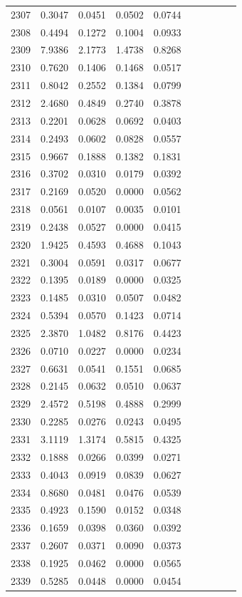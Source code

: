 \begin{table}
\begin{tabular}{cccccccccc}
2307& 0.3047& 0.0451& 0.0502& 0.0744\\ 
2308& 0.4494& 0.1272& 0.1004& 0.0933\\ 
2309& 7.9386& 2.1773& 1.4738& 0.8268\\ 
2310& 0.7620& 0.1406& 0.1468& 0.0517\\ 
2311& 0.8042& 0.2552& 0.1384& 0.0799\\ 
2312& 2.4680& 0.4849& 0.2740& 0.3878\\ 
2313& 0.2201& 0.0628& 0.0692& 0.0403\\ 
2314& 0.2493& 0.0602& 0.0828& 0.0557\\ 
2315& 0.9667& 0.1888& 0.1382& 0.1831\\ 
2316& 0.3702& 0.0310& 0.0179& 0.0392\\ 
2317& 0.2169& 0.0520& 0.0000& 0.0562\\ 
2318& 0.0561& 0.0107& 0.0035& 0.0101\\ 
2319& 0.2438& 0.0527& 0.0000& 0.0415\\ 
2320& 1.9425& 0.4593& 0.4688& 0.1043\\ 
2321& 0.3004& 0.0591& 0.0317& 0.0677\\ 
2322& 0.1395& 0.0189& 0.0000& 0.0325\\ 
2323& 0.1485& 0.0310& 0.0507& 0.0482\\ 
2324& 0.5394& 0.0570& 0.1423& 0.0714\\ 
2325& 2.3870& 1.0482& 0.8176& 0.4423\\ 
2326& 0.0710& 0.0227& 0.0000& 0.0234\\ 
2327& 0.6631& 0.0541& 0.1551& 0.0685\\ 
2328& 0.2145& 0.0632& 0.0510& 0.0637\\ 
2329& 2.4572& 0.5198& 0.4888& 0.2999\\ 
2330& 0.2285& 0.0276& 0.0243& 0.0495\\ 
2331& 3.1119& 1.3174& 0.5815& 0.4325\\ 
2332& 0.1888& 0.0266& 0.0399& 0.0271\\ 
2333& 0.4043& 0.0919& 0.0839& 0.0627\\ 
2334& 0.8680& 0.0481& 0.0476& 0.0539\\ 
2335& 0.4923& 0.1590& 0.0152& 0.0348\\ 
2336& 0.1659& 0.0398& 0.0360& 0.0392\\ 
2337& 0.2607& 0.0371& 0.0090& 0.0373\\ 
2338& 0.1925& 0.0462& 0.0000& 0.0565\\ 
2339& 0.5285& 0.0448& 0.0000& 0.0454\\ 

\end{tabular}
\end{table}
